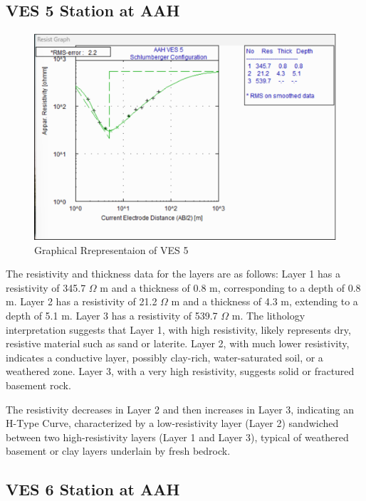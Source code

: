 \documentclass[12pt,a4paper]{report}
\begin{document}
\subsection{VES 5 Station at AAH}

\begin{figure}[H]
    \centering
    \includegraphics[width=1.0\textwidth]{aah_ves5.png}
    \caption{Graphical Rrepresentaion of VES 5}
    \label{fig:AAH_VES_5_Curve}
\end{figure}
The resistivity and thickness data for the layers are as follows: Layer 1 has a resistivity of 345.7 $\Omega$ m and a thickness of 0.8 m, corresponding to a depth of 0.8 m. Layer 2 has a resistivity of 21.2 $\Omega$ m and a thickness of 4.3 m, extending to a depth of 5.1 m. Layer 3 has a resistivity of 539.7 $\Omega$ m. The lithology interpretation suggests that Layer 1, with high resistivity, likely represents dry, resistive material such as sand or laterite. Layer 2, with much lower resistivity, indicates a conductive layer, possibly clay-rich, water-saturated soil, or a weathered zone. Layer 3, with a very high resistivity, suggests solid or fractured basement rock.

The resistivity decreases in Layer 2 and then increases in Layer 3, indicating an H-Type Curve, characterized by a low-resistivity layer (Layer 2) sandwiched between two high-resistivity layers (Layer 1 and Layer 3), typical of weathered basement or clay layers underlain by fresh bedrock.

\subsection{VES 6 Station at AAH}
\end{document}
